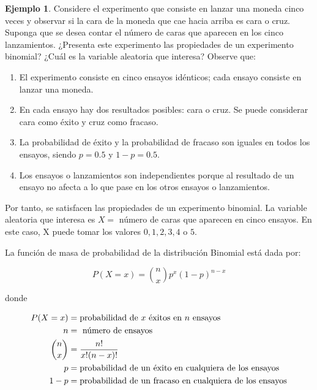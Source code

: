 \documentclass[
  11pt,
]{book}
\providecommand{\tightlist}{%
  \setlength{\itemsep}{0pt}\setlength{\parskip}{0pt}}
\theoremstyle{definition}
\theoremstyle{definition}
\newtheorem{example}{Ejemplo}[chapter]
\theoremstyle{definition}
\theoremstyle{definition}
\theoremstyle{remark}
\begin{document}
\begin{example}
Considere el experimento que consiste en lanzar una moneda cinco veces y observar si la cara de la moneda que cae hacia arriba es cara o cruz. Suponga que se desea contar el número de caras que aparecen en los cinco lanzamientos. ¿Presenta este experimento las propiedades de un experimento binomial? ¿Cuál es la variable aleatoria que interesa? Observe que:

\begin{enumerate}
\def\labelenumi{\arabic{enumi}.}
\tightlist
\item
  El experimento consiste en cinco ensayos idénticos; cada ensayo consiste en lanzar una moneda.
\item
  En cada ensayo hay dos resultados posibles: cara o cruz. Se puede considerar cara como éxito y cruz como fracaso.
\item
  La probabilidad de éxito y la probabilidad de fracaso son iguales en todos los ensayos, siendo \(p = 0.5\) y \(1 - p = 0.5\).
\item
  Los ensayos o lanzamientos son independientes porque al resultado de un ensayo no afecta a lo que pase en los otros ensayos o lanzamientos.
\end{enumerate}

Por tanto, se satisfacen las propiedades de un experimento binomial. La variable aleatoria que interesa es \(X =\) número de caras que aparecen en cinco ensayos. En este caso, X puede tomar los valores \(0, 1, 2, 3, 4\) o \(5\).
\end{example}

La función de masa de probabilidad de la distribución Binomial está dada por:

\begin{equation}
P(X = x) = \binom{n}{x}p^x(1-p)^{n-x}
\label{eq:binomial}
\end{equation}

donde

\begin{equation}
\notag
\begin{split}
P(X = x) &= \text{probabilidad de } x \text{ éxitos en } n \text{ ensayos}\\
n &= \text{ número de ensayos}\\
\binom{n}{x} &= \dfrac{n!}{x!(n-x)!}\\
p &= \text{probabilidad de un éxito en cualquiera de los ensayos}\\
1 - p &= \text{probabilidad de un fracaso en cualquiera de los ensayos}\\
\end{split}
\end{equation}
\end{document}

